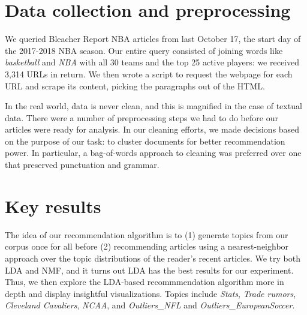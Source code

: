 \documentclass{article}
\begin{document}
\section{Data collection and preprocessing}


We queried Bleacher Report NBA
articles from last October 17, the start day of the 2017-2018 NBA season. Our entire query consisted of
joining words like \emph{basketball} and \emph{NBA} with all 30 teams and the top 25 active players:
we received 3,314 URLs in return.
We then wrote a script to request the webpage for each URL and scrape its content, picking the
paragraphs out of the HTML.

In the real world, data is never clean, and this is magnified in the case of textual data. There
were a number of preprocessing steps we had to do before our articles were ready for analysis. In
our cleaning efforts, we made decisions based on the purpose of our task: to cluster documents for
better recommendation power. In particular, a bag-of-words approach to cleaning was preferred 
over one that preserved punctuation and grammar.

\section{Key results}

The idea of our recommendation algorithm is to (1) generate topics from our corpus once for all
before (2)
recommending articles using a nearest-neighbor approach over the topic distributions of the reader's 
recent articles. We try both LDA and NMF, and it turns out LDA has the best results for our experiment.
Thus, we then explore the LDA-based recommmendation algorithm more in depth and display
insightful visualizations. Topics include \emph{Stats}, \emph{Trade rumors}, \emph{Cleveland Cavaliers},
\emph{NCAA}, and \emph{Outliers\_NFL} and \emph{Outliers\_EuropeanSoccer}.

% 
\end{document}
